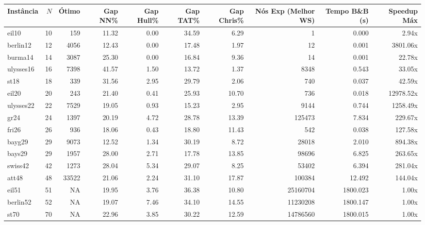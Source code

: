 \begin{tabular}{lrrrrrrrrr}
\hline
\textbf{Instância} & $N$ & \textbf{Ótimo} & \textbf{Gap NN\%} & \textbf{Gap Hull\%} & \textbf{Gap TAT\%} & \textbf{Gap Chris\%} & \textbf{Nós Exp (Melhor WS)} & \textbf{Tempo B\&B (s)} & \textbf{Speedup Máx} \\
\hline
eil10 & 10 & 159 & 11.32 & 0.00 & 34.59 & 6.29 & 1 & 0.000 & 2.94x \\
berlin12 & 12 & 4056 & 12.43 & 0.00 & 17.48 & 1.97 & 12 & 0.001 & 3801.06x \\
burma14 & 14 & 3087 & 25.30 & 0.00 & 16.84 & 9.36 & 14 & 0.001 & 22.78x \\
ulysses16 & 16 & 7398 & 41.57 & 1.50 & 13.72 & 1.37 & 8348 & 0.543 & 33.05x \\
st18 & 18 & 339 & 31.56 & 2.95 & 29.79 & 2.06 & 740 & 0.037 & 42.59x \\
eil20 & 20 & 243 & 21.40 & 0.41 & 25.93 & 10.70 & 736 & 0.018 & 12978.52x \\
ulysses22 & 22 & 7529 & 19.05 & 0.93 & 15.23 & 2.95 & 9144 & 0.744 & 1258.49x \\
gr24 & 24 & 1397 & 20.19 & 4.72 & 28.78 & 13.39 & 125473 & 7.834 & 229.67x \\
fri26 & 26 & 936 & 18.06 & 0.43 & 18.80 & 11.43 & 542 & 0.038 & 127.58x \\
bayg29 & 29 & 9073 & 12.52 & 1.34 & 30.19 & 8.72 & 28018 & 2.010 & 894.38x \\
bays29 & 29 & 1957 & 28.00 & 2.71 & 17.78 & 13.85 & 98696 & 6.825 & 263.65x \\
swiss42 & 42 & 1273 & 28.04 & 5.34 & 29.07 & 8.25 & 53402 & 6.394 & 281.04x \\
att48 & 48 & 33522 & 21.06 & 2.24 & 31.10 & 17.87 & 100384 & 12.492 & 144.04x \\
eil51 & 51 & NA & 19.95 & 3.76 & 36.38 & 10.80 & 25160704 & 1800.023 & 1.00x \\
berlin52 & 52 & NA & 19.07 & 7.46 & 34.10 & 14.55 & 11230208 & 1800.147 & 1.00x \\
st70 & 70 & NA & 22.96 & 3.85 & 30.22 & 12.59 & 14786560 & 1800.015 & 1.00x \\
\hline
\end{tabular}
